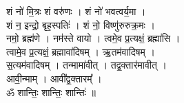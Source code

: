 शं नो॑ मि॒त्रः शं वरु॑णः । शं नो॑ भवत्वर्य॒मा ।\\
शं न॒ इन्द्रो॒ बृह॒स्पतिः॑ । शं नो॒ विष्णु॑रुरुक्र॒मः ।\\
नमो॒ ब्रह्म॑णे । नम॑स्ते वायो । त्वमे॒व प्र॒त्यक्षं॒ ब्रह्मा॑सि ।\\
त्वामे॒व प्र॒त्यक्षं॒ ब्रह्मावा॑दिषम् । ऋ॒तम॑वादिषम् ।\\
स॒त्यम॑वादिषम् । तन्मामा॑वीत् । तद्व॒क्तार॑मावीत् ।\\
आवी॒न्माम् । आवी᳚द्व॒क्तारम्᳚ ।\\
ॐ शान्तिः॒ शान्तिः॒ शान्तिः॑ ॥\\